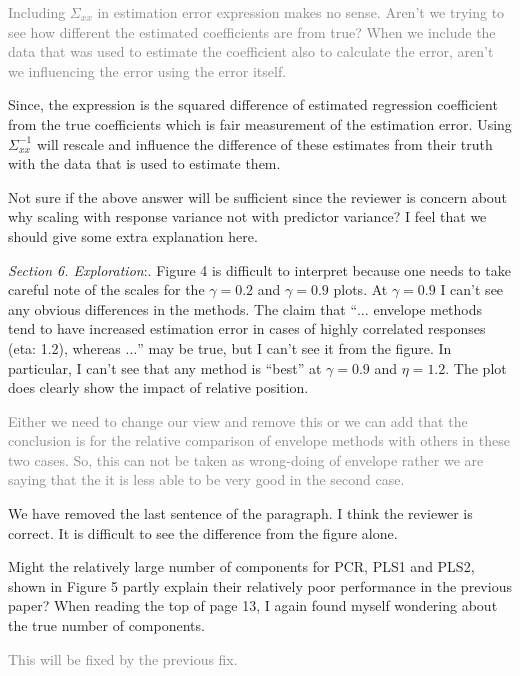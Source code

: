 \documentclass[12pt, a4paper]{scrartcl}
\begin{document}
\textcolor{gray}{Including $\Sigma_{xx}$ in estimation error expression makes no sense. Aren't we trying to see how different the estimated coefficients are from true? When we include the data that was used to estimate the coefficient also to calculate the error, aren't we influencing the error using the error itself.}

\textcolor{answers}{Since, the expression is the squared difference of estimated regression coefficient from the true coefficients which is fair measurement of the estimation error. Using $\Sigma_{xx}^{-1}$ will rescale and influence the difference of these estimates from their truth with the data that is used to estimate them.}

\textcolor{critical}{Not sure if the above answer will be sufficient since the reviewer is concern about why scaling with response variance not with predictor variance? I feel that we should give some extra explanation here.}

\textit{Section 6. Exploration}:. Figure 4 is difficult to interpret because one needs to take careful note of the scales for the $\gamma = 0.2$ and $\gamma = 0.9$ plots. At $\gamma = 0.9$ I can’t see any obvious differences in the methods. The claim that ``$\ldots$ envelope methods tend to have increased estimation error in cases of highly correlated responses (eta: 1.2), whereas $\ldots$'' may be true,
but I can’t see it from the figure. In particular, I can’t see that any method is “best” at $\gamma = 0.9$ and $\eta = 1.2$. The plot does clearly show the impact of relative position.

\textcolor{gray}{Either we need to change our view and remove this or we can add that the conclusion is for the relative comparison of envelope methods with others in these two cases. So, this can not be taken as wrong-doing of envelope rather we are saying that the it is less able to be very good in the second case.}

\textcolor{answers}{We have removed the last sentence of the paragraph. I think the reviewer is correct. It is difficult to see the difference from the figure alone.}

Might the relatively large number of components for PCR, PLS1 and PLS2, shown in Figure 5 partly explain their relatively poor performance in the previous paper? When reading the top of page 13, I again found myself wondering about the true number of components.

\textcolor{gray}{This will be fixed by the previous fix.}
\end{document}
